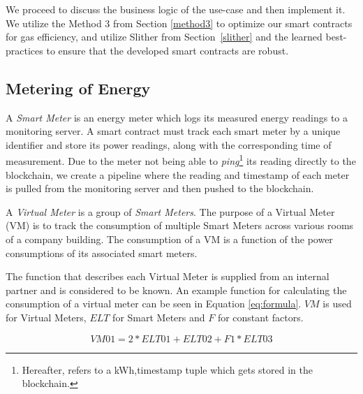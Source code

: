 We proceed to discuss the business logic of the use-case and then implement it. We utilize the Method 3 from Section \ref{method3} to optimize our smart contracts for gas efficiency, and utilize Slither from Section~\ref{slither} and the learned best-practices to ensure that the developed smart contracts are robust. 

\subsection{Metering of Energy} \label{metering}


A \textit{Smart Meter} is an energy meter which logs its measured energy readings to a monitoring server. A smart contract must track each smart meter by a unique identifier and store its power readings, along with the corresponding time of measurement. Due to the meter not being able to \textit{ping}\footnote{Hereafter, refers to a kWh,timestamp tuple which gets stored in the blockchain.} its reading directly to the blockchain, we create a pipeline where the reading and timestamp of each meter is pulled from the monitoring server and then pushed to the blockchain. 




A \textit{Virtual Meter} is a group of \textit{Smart Meters}. The purpose of a Virtual Meter (VM) is to track the consumption of multiple Smart Meters across various rooms of a company building. The consumption of a VM is a function of the power consumptions of its associated smart meters. 

The function that describes each Virtual Meter is supplied from an internal partner and is considered to be known. An example function for calculating the consumption of a virtual meter can be seen in Equation \ref{eq:formula}. $VM$ is used for Virtual Meters, $ELT$ for Smart Meters and $F$ for constant factors.

\begin{equation} \label{eq:formula}
    VM01 = 2 * ELT01 + ELT02 + F1 * ELT03
\end{equation}

